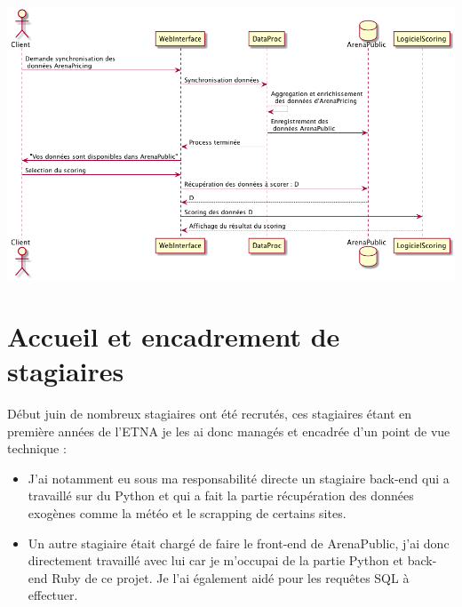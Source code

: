 \begin{center}
\includegraphics[scale=0.52]{images/scoring.png}
\label{scoring}
\end{center}


\section{Accueil et encadrement de stagiaires}
Début juin de nombreux stagiaires ont été recrutés, ces stagiaires étant en première années de l'ETNA je les ai donc managés et encadrée d'un point de vue technique :
\begin{itemize}
	\item[\textbullet] J'ai notamment eu sous ma responsabilité directe un stagiaire back-end qui a travaillé sur du Python et qui a fait la partie récupération des données exogènes comme la météo et le scrapping de certains sites. 
	\item[\textbullet] Un autre stagiaire était chargé de faire le front-end de ArenaPublic, j'ai donc directement travaillé avec lui car je m'occupai de la partie Python et back-end Ruby de ce projet. Je l'ai également aidé pour les requêtes SQL à effectuer.
\end{itemize}

  


